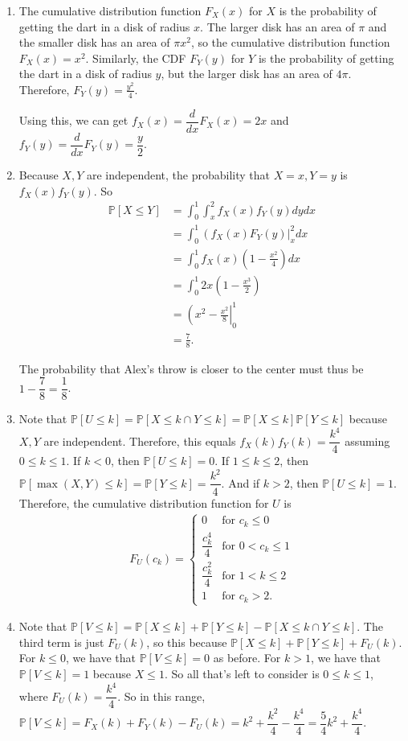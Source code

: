 \documentclass{article}
\newcommand{\p}{\mathbb{P}}
\begin{document}
\begin{enumerate}[label=(\alph*)]
	\item The cumulative distribution function $F_X(x)$ for $X$ is the probability of getting the dart in a disk of radius $x$. The larger disk has an area of $\pi$ and the smaller disk has an area of $\pi x^2$, so the cumulative distribution function $\boxed{F_X(x) = x^2}$. Similarly, the CDF $F_Y(y)$ for $Y$ is the probability of getting the dart in a disk of radius $y$, but the larger disk has an area of $4\pi$. Therefore, $\boxed{F_Y(y) = \frac{y^2}{4}}$.

	Using this, we can get $f_X(x) = \dfrac{d}{dx} F_X(x) = 2x$ and $f_Y(y) = \dfrac{d}{dx} F_Y(y) = \dfrac{y}{2}$.
	\item Because $X, Y$ are independent, the probability that $X=x, Y=y$ is $f_X(x) f_Y(y)$. So 
	\begin{align*}
		\p[X \leq Y] &= \int_0^1 \int_x^2 f_X(x) f_Y(y) dydx \\
		&= \int_0^1 \left(f_X(x) F_Y(y) \right|_x^2 dx \\
		&= \int_0^1 f_X(x) \left(1-\frac{x^2}{4}\right) dx \\
		&= \int_0^1 2x\left(1-\frac{x^3}{2}\right) \\ 
		&= \left(x^2-\frac{x^2}{8}\right|_0^1 \\
		&= \boxed{\frac{7}{8}}.
	\end{align*}

	The probability that Alex's throw is closer to the center must thus be $1-\dfrac{7}{8} = \boxed{\dfrac{1}{8}}$.
	\item Note that $\p[U \leq k] = \p[X \leq k \cap Y \leq k] = \p[X \leq k] \p[Y \leq k]$ because $X, Y$ are independent. Therefore, this equals $f_X(k) f_Y(k) = \dfrac{k^4}{4}$ assuming $0 \leq k \leq 1$. If $k < 0$, then $\p[U \leq k] = 0$. If $1 \leq k \leq 2$, then $\p[\max(X, Y) \leq k] = \p[Y \leq k] = \dfrac{k^2}{4}$. And if $k > 2$, then $\p[U \leq k] = 1$. Therefore, the cumulative distribution function for $U$ is  
	\begin{align*}
		F_{U}(c_k) = \begin{cases}
			0 & \text{for } c_k \leq 0 \\
			\dfrac{c_k^4}{4} & \text{for } 0 < c_k \leq 1 \\
			\dfrac{c_k^2}{4} & \text{for } 1 < k \leq 2 \\
			1 & \text{for } c_k > 2.
		\end{cases}
	\end{align*}
	\item Note that $\p[V \leq k] = \p[X \leq k] + \p[Y \leq k] - \p[X \leq k \cap Y \leq k]$. The third term is just $F_{U}(k)$, so this because $\p[X \leq k] + \p[Y \leq k] + F_{U}(k)$. For $k \leq 0$, we have that $\p[V \leq k] = 0$ as before. For $k > 1$, we have that $\p[V \leq k] = 1$ because $X \leq 1$. So all that's left to consider is $0 \leq k \leq 1$, where $F_{U}(k) = \dfrac{k^4}{4}$. So in this range, $\p[V \leq k] = F_X(k) + F_Y(k) - F_{U}(k) = k^2 + \dfrac{k^2}{4} - \dfrac{k^4}{4} = \dfrac{5}{4}k^2 + \dfrac{k^4}{4}$.


\end{enumerate}
\end{document}
